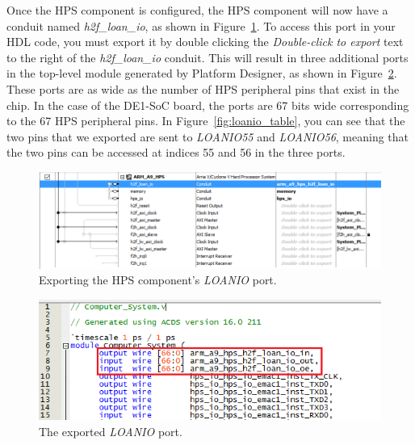 \documentclass[11pt, twoside, pdftex]{article}
\begin{document}
Once the HPS component is configured, the HPS component will now have a conduit named \textit{h2f\_loan\_io}, as shown in Figure~\ref{fig:hps_component_loanio_port}. To access this port in your HDL code, you must export it by double clicking the \textit{Double-click to export} text to the right of the \textit{h2f\_loan\_io} conduit. This will result in three additional ports in the top-level module generated by Platform Designer, as shown in Figure~\ref{fig:exported_loanio}. These ports are as wide as the number of HPS peripheral pins that exist in the chip. In the case of the DE1-SoC board, the ports are 67 bits wide corresponding to the 67 HPS peripheral pins. In Figure~\ref{fig:loanio_table}, you can see that the two pins that we exported are sent to \textit{LOANIO55} and \textit{LOANIO56}, meaning that the two pins can be accessed at indices 55 and 56 in the three ports. 

\begin{figure} [H]
\begin{center}
\includegraphics[scale = 0.7]{figures/fig_qsys_loanio_export.png}
\end{center}
\caption{Exporting the HPS component's \textit{LOANIO} port.}
\label{fig:hps_component_loanio_port}
\end{figure}

\begin{figure} [H]
\begin{center}
\includegraphics[scale = 0.7]{figures/fig_exported_loanio.png}
\end{center}
\caption{The exported \textit{LOANIO} port.}
\label{fig:exported_loanio}
\end{figure}
\end{document}
